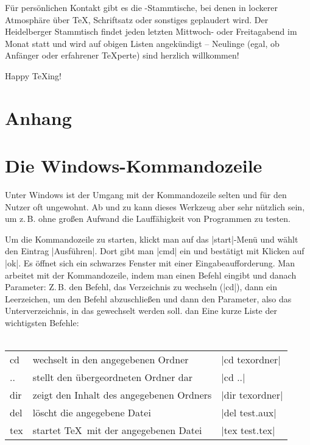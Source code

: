 \documentclass[12pt,ngerman]{scrartcl}
\begin{document}
Für persönlichen Kontakt gibt es die \DANTE-Stammtische, bei denen in lockerer Atmosphäre über \TeX, Schriftsatz oder sonstiges geplaudert wird. Der Heidelberger Stammtisch findet jeden letzten Mittwoch- oder Freitagabend im Monat statt und wird auf obigen Listen angekündigt – Neulinge (egal, ob Anfänger oder erfahrener \TeX perte) sind herzlich willkommen!
\vspace{1cm}

{\Large Happy \TeX{}ing!}

\newpage
\begin{appendix}
\section*{Anhang}
\section{Die Windows-Kommandozeile}
Unter\label{cmd} Windows ist der Umgang mit der Kommandozeile selten und für den Nutzer oft ungewohnt. Ab und zu kann dieses Werkzeug aber sehr nützlich sein, um z.\,B. ohne großen Aufwand die Lauffähigkeit von Programmen zu testen.

Um die Kommandozeile zu starten, klickt man auf das |start|-Menü und wählt den Eintrag |Ausführen|. Dort gibt man |cmd| ein und bestätigt mit Klicken auf |ok|. Es öffnet sich ein schwarzes Fenster mit einer Eingabeaufforderung. Man arbeitet mit der Kommandozeile, indem man einen Befehl eingibt und danach Parameter: Z.\,B. den Befehl, das Verzeichnis zu wechseln (|cd|), dann ein Leerzeichen, um den Befehl abzuschließen und dann den Parameter, also das Unterverzeichnis, in das gewechselt werden soll.
dan
Eine kurze Liste der wichtigsten Befehle:
\\ \\\hfill
\begin{minipage}{\textwidth}
\begin{tabular}{lll}
  cd & wechselt in den angegebenen Ordner & |cd texordner|\\
  .. & stellt den übergeordneten Ordner dar & |cd ..|\\
  dir & zeigt den Inhalt des angegebenen Ordners & |dir texordner|\\
  del & löscht die angegebene Datei & |del test.aux|\\
  tex & startet \TeX\ mit der angegebenen Datei & |tex test.tex|\\
\end{tabular}
\end{minipage}\hfill
\end{appendix}
\end{document}
